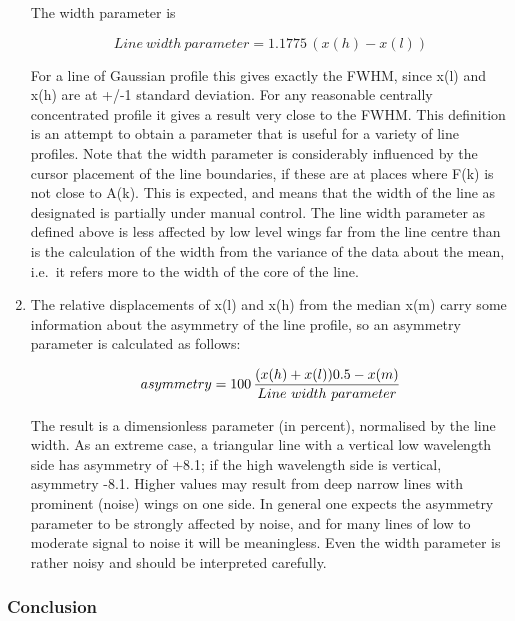 \documentclass[11pt,twoside]{article}
\begin{document}
\begin{enumerate}
   The width parameter is

\begin{displaymath}
   Line \ width \ parameter = 1.1775\, (x(h)-x(l))
\end{displaymath}

   For a line of Gaussian profile this gives exactly the FWHM, since
   x(l) and x(h) are at +/-1 standard deviation. For any reasonable
   centrally concentrated profile it gives a result very close to the
   FWHM. This definition is an attempt to obtain a parameter that is
   useful for a variety of line profiles. Note that the width parameter
   is considerably influenced by the cursor placement of the line
   boundaries, if these are at places where F(k) is not close to A(k).
   This is expected, and means that the width of the line as designated
   is partially under manual control. The line width parameter as
   defined above is less affected by low level wings far from the line
   centre than is the calculation of the width from the variance of the
   data about the mean, i.e.\ it refers more to the width of the core of
   the line.

\item
   The relative displacements of x(l) and x(h) from the median x(m)
   carry some information about the asymmetry of the line profile, so an
   asymmetry parameter is calculated as follows:

\begin{displaymath}
   asymmetry = 100\, {(x(h)+x(l)) 0.5 - x(m)\over
      Line \ width \ parameter}
\end{displaymath}

   The result is a dimensionless parameter (in percent), normalised by
   the line width. As an extreme case, a triangular line with a vertical
   low wavelength side has asymmetry of +8.1; if the high wavelength side
   is vertical, asymmetry -8.1. Higher values may result from deep
   narrow lines with prominent (noise) wings on one side. In general one
   expects the asymmetry parameter to be strongly affected by noise, and
   for many lines of low to moderate signal to noise it will be
   meaningless. Even the width parameter is rather noisy and should be
   interpreted carefully.
\end{enumerate}


\subsubsection{\label{techno11concl}Conclusion}
\end{document}
